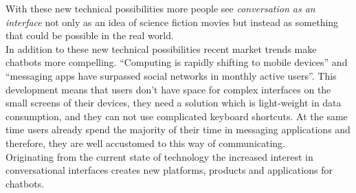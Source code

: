 With these new technical possibilities more people see \emph{conversation as an interface} not only as an idea of science fiction movies but instead as something that could be possible in the real world.
\\

In addition to these new technical possibilities recent market trends make chatbots more compelling. ``Computing is rapidly shifting to mobile devices''\cite{mobileusage} and ``messaging apps have surpassed social networks in monthly active users''\cite{convtrends}. This development means that users don't have space for complex interfaces on the small screens of their devices, they need a solution which is light-weight in data consumption, and they can not use complicated keyboard shortcuts. At the same time users already spend the majority of their time in messaging applications and therefore, they are well accustomed to this way of communicating.
\\

Originating from the current state of technology the increased interest in conversational interfaces creates new platforms, products and applications for chatbots.



